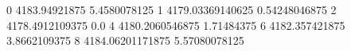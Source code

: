 0 4183.94921875 5.4580078125
1 4179.03369140625 0.54248046875
2 4178.4912109375 0.0
4 4180.2060546875 1.71484375
6 4182.357421875 3.8662109375
8 4184.06201171875 5.57080078125
